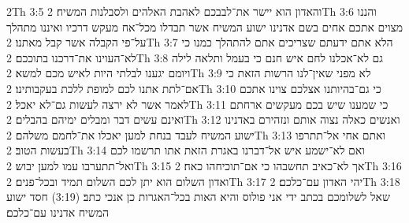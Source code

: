 2Th 3:5  והאדון הוא יישר את־לבבכם לאהבת האלהים ולסבלנות המשיח׃
2Th 3:6  והננו מצוים אתכם אחים בשם אדנינו ישוע המשיח אשר תבדלו מכל־אח מעקש דרכיו ואיננו מתהלך על־פי הקבלה אשר קבל מאתנו׃
2Th 3:7  הלא אתם ידעתם שצריכים אתם להתהלך כמנו כי לא־העוינו את־דרכנו בתוככם׃
2Th 3:8  גם לא־אכלנו לחם איש חנם כי בעמל ותלאה לילה ויומם יגענו לבלתי היות לאיש מכם למשא׃
2Th 3:9  לא מפני שאין־לנו הרשות הזאת כי אם־לתת אתנו לכם למופת ללכת בעקבותינו׃
2Th 3:10  כי גם־בהיותנו אצלכם צוינו אתכם לאמר אשר לא ירצה לעשות גם־לא יאכל׃
2Th 3:11  כי שמענו שיש בכם מעקשים ארחתם ואינם עשים דבר ומבלים ימיהם בהבלים׃
2Th 3:12  ואנשים כאלה נצוה אותם ונזהירם באדנינו ישוע המשיח לעבד בנחת למען יאכלו את־לחמם משלהם׃
2Th 3:13  ואתם אחי אל־תתרפו בעשות הטוב׃
2Th 3:14  ואם לא־ישמע איש אל־דברנו באגרת הזאת אתו תרשמו לכם ואל־תתערבו עמו למען יבוש׃
2Th 3:15  אך לא־כאיב תחשבהו כי אם־תוכיחהו כאח׃
2Th 3:16  ואדון השלום הוא יתן לכם השלום תמיד ובכל־פנים׃
2Th 3:17  יהי האדון עם־כלכם׃
2Th 3:18  שאל לשלומכם בכתב ידי אני פולוס והיא האות בכל־האגרות כן אנכי כתב׃ (3:19) חסד ישוע המשיח אדנינו עם־כלכם׃


